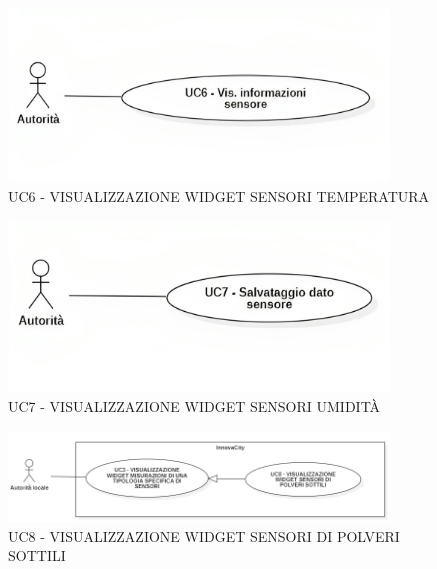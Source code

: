 


\begin{figure}[H]
    \centering
    \includegraphics[width=0.9\textwidth]{../Images/uc6.png}
    \caption{UC6 - VISUALIZZAZIONE WIDGET SENSORI TEMPERATURA}
    \label{fig:UC6}
\end{figure}


\begin{figure}[H]
    \centering
    \includegraphics[width=0.9\textwidth]{../Images/uc7.png}
    \caption{UC7 - VISUALIZZAZIONE WIDGET SENSORI UMIDITÀ}
\end{figure}


\begin{figure}[H]
    \centering
    \includegraphics[width=0.9\textwidth]{../Images/uc8.PNG}
    \caption{UC8 - VISUALIZZAZIONE WIDGET SENSORI DI POLVERI SOTTILI}
\end{figure}

